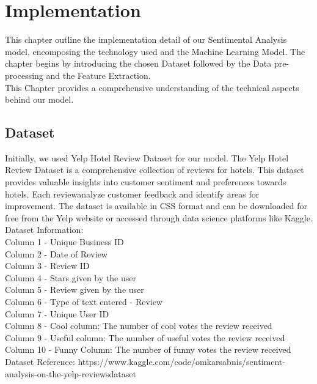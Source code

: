 \documentclass[a4paper, 12pt]{report}
\begin{document}
\chapter{Implementation}
This chapter outline the implementation detail of our Sentimental Analysis model, encomposing the technology used and the Machine Learning Model. The chapter begins by introducing the chosen Dataset followed by the Data pre-processing and the Feature Extraction.\\
This Chapter provides a comprehensive understanding of the technical aspects behind our model.   
\section{Dataset}
Initially, we used Yelp Hotel Review Dataset for our model.
The Yelp Hotel Review Dataset is a comprehensive collection of reviews for hotels. This dataset provides valuable insights into customer sentiment and preferences towards hotels. Each reviewanalyze customer feedback and identify areas for improvement. The dataset is available in CSS format and can be downloaded for free from the Yelp website or accessed through data science platforms like Kaggle.
\\
Dataset Information:\\
Column 1 - Unique Business ID\\
Column 2 - Date of Review\\
Column 3 - Review ID\\
Column 4 - Stars given by the user\\
Column 5 - Review given by the user\\
Column 6 - Type of text entered - Review\\
Column 7 - Unique User ID\\
Column 8 - Cool column: The number of cool votes the review received\\
Column 9 - Useful column: The number of useful votes the review received\\
Column 10 - Funny Column: The number of funny votes the review received
\\Dataset Reference: https://www.kaggle.com/code/omkarsabnis/sentiment-analysis-on-the-yelp-reviewsdataset
\pagebreak
\end{document}

